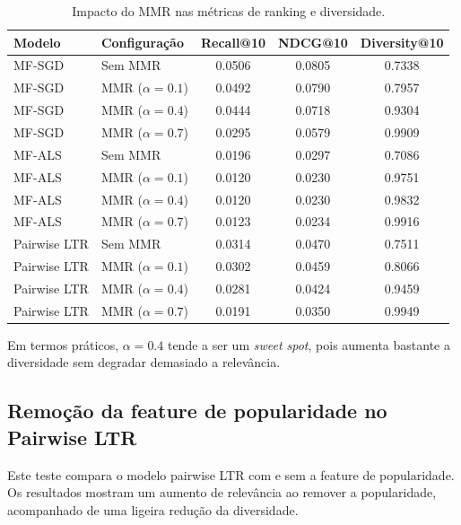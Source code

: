 \documentclass[10pt]{article}
\begin{document}
\begin{table}[H]
\centering
\small
\renewcommand{\arraystretch}{1.2}
\begin{tabular}{llccc}
\toprule
\textbf{Modelo} & \textbf{Configuração} & \textbf{Recall@10} & \textbf{NDCG@10} & \textbf{Diversity@10} \\
\midrule
MF-SGD & Sem MMR & 0.0506 & 0.0805 & 0.7338 \\
MF-SGD & MMR (\(\alpha=0.1\)) & 0.0492 & 0.0790 & 0.7957 \\
MF-SGD & MMR (\(\alpha=0.4\)) & 0.0444 & 0.0718 & 0.9304 \\
MF-SGD & MMR (\(\alpha=0.7\)) & 0.0295 & 0.0579 & 0.9909 \\
\midrule
MF-ALS & Sem MMR & 0.0196 & 0.0297 & 0.7086 \\
MF-ALS & MMR (\(\alpha=0.1\)) & 0.0120 & 0.0230 & 0.9751 \\
MF-ALS & MMR (\(\alpha=0.4\)) & 0.0120 & 0.0230 & 0.9832 \\
MF-ALS & MMR (\(\alpha=0.7\)) & 0.0123 & 0.0234 & 0.9916 \\
\midrule
Pairwise LTR & Sem MMR & 0.0314 & 0.0470 & 0.7511 \\
Pairwise LTR & MMR (\(\alpha=0.1\)) & 0.0302 & 0.0459 & 0.8066 \\
Pairwise LTR & MMR (\(\alpha=0.4\)) & 0.0281 & 0.0424 & 0.9459 \\
Pairwise LTR & MMR (\(\alpha=0.7\)) & 0.0191 & 0.0350 & 0.9949 \\
\bottomrule
\end{tabular}
\caption{Impacto do MMR nas métricas de ranking e diversidade.}
\label{tab:ablation_mmr}
\end{table}

Em termos práticos, \(\alpha=0.4\) tende a ser um \textit{sweet spot}, pois aumenta bastante a diversidade sem degradar demasiado a relevância.


\subsection{Remoção da feature de popularidade no Pairwise LTR}

Este teste compara o modelo pairwise LTR com e sem a feature de popularidade. Os resultados mostram um aumento de relevância ao remover a popularidade, acompanhado de uma ligeira redução da diversidade.
\end{document}
